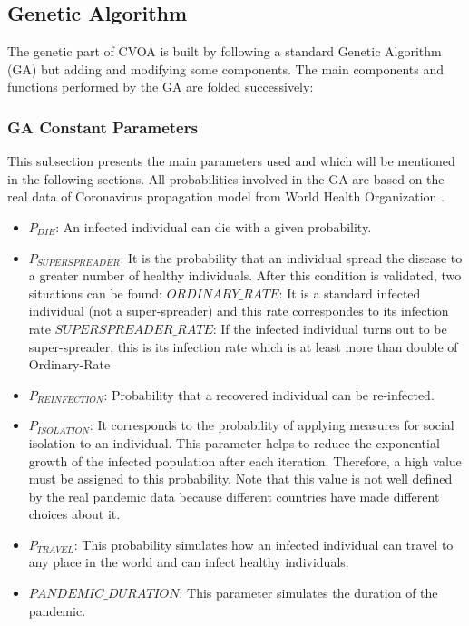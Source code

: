 \documentclass[letterpaper]{article}%
\begin{document}
\subsection{Genetic Algorithm}
	The genetic part of CVOA is built by following a standard Genetic Algorithm (GA) but adding and modifying some components.
The main components and functions performed by the GA are folded successively:

\subsubsection{GA Constant Parameters}
This subsection presents the main parameters used and which will be mentioned in the following sections.
All probabilities involved in the GA are based on the real data of Coronavirus propagation model from World Health Organization \cite{who}.
\begin{itemize}
\item $P_{DIE}$: An infected individual can die with a given probability.
\item $P_{SUPERSPREADER}$: It is the probability that an individual spread the disease to a greater number of healthy individuals. After this condition is validated, two situations can be found: %
\subitem $ORDINARY\_RATE$: It is a standard infected individual (not a super-spreader) and this rate correspondes to its infection rate
\subitem $SUPERSPREADER\_RATE$: If the infected individual turns out to be super-spreader, this is its infection rate which is at least more than double of Ordinary-Rate
\item $P_{REINFECTION}$: Probability that a recovered individual can be re-infected.
\item $P_{ISOLATION}$: It corresponds to the probability of applying measures for social isolation to an individual. This parameter helps to reduce the exponential growth of the infected population after each iteration. Therefore, a high value must be assigned to this probability. Note that this value is not well defined by the real pandemic data because different countries have made different choices about it. 
\item $P_{TRAVEL}$: This probability simulates how an infected individual can travel to any place in the world and can infect healthy individuals.
\item $PANDEMIC\_DURATION$: This parameter simulates the duration of the pandemic.
\end{itemize}
\end{document}
